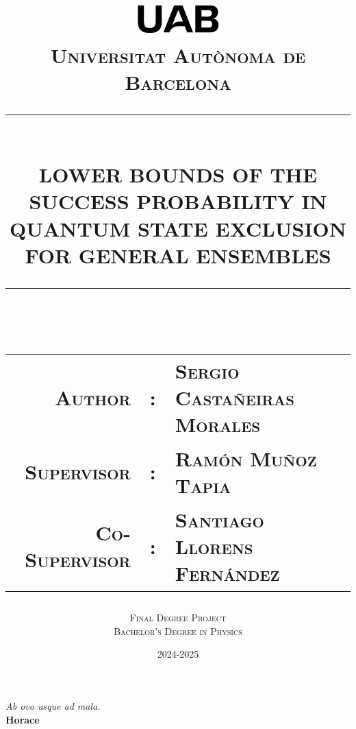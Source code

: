 \documentclass[12pt,letterpaper]{article}
\newcommand{\HRule}[1]{\rule{\linewidth}{#1}}
\newcommand\subject{Final Degree Project}
\newcommand\degree{Bachelor's Degree in Physics}
\newcommand\documenttitle{Lower bounds of the success probability in quantum state exclusion for general ensembles}
\newcommand\NetIDb{Universitat Autònoma de Barcelona}
\newcommand\AuthorName{Sergio Castañeiras Morales}
\begin{document}
\title{\vspace{4cm} \normalsize 
		\includegraphics[width = 0.25\textwidth]{GeneralSources/UABLogo.png}\\ [0.5cm]
		\textsc{\NetIDb}\\ [2.0cm]
		\HRule{0.5pt} \\
		\LARGE \textbf{\uppercase{\documenttitle}}
		\HRule{2pt} \\ [1.5cm]
		\normalsize \begin{tabular}{rcl}  %
        \textsc{Author} & : & \textsc{\AuthorName} \\
        \textsc{Supervisor} & : & \textsc{Ramón Muñoz Tapia} \\
        \textsc{Co-Supervisor} & : & \textsc{Santiago Llorens Fernández}
    \end{tabular}
    \normalsize \vspace*{5\baselineskip}
		}

\date{2024-2025}

\author{\large \textsc{\subject} \\ \textsc{\degree}}



\begin{titlepage}
\clearpage\maketitle
\thispagestyle{empty}
\end{titlepage}

\thispagestyle{empty}
\mbox{} 
\newpage
\thispagestyle{empty}
\vspace*{\fill} %
\begin{flushright}
    \emph{Ab ovo usque ad mala.}\\[1em]
    \textbf{Horace}
\end{flushright}
\vspace*{\fill} 
\newpage
\end{document}
